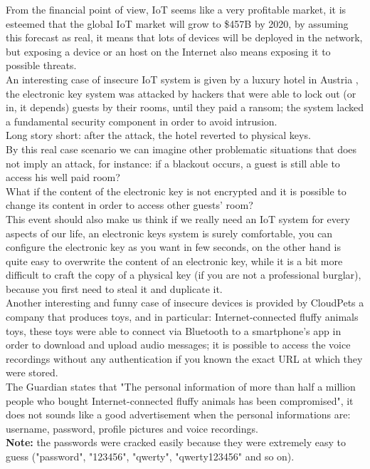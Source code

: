\documentclass[12pt]{report}
\begin{document}
From the financial point of view, IoT seems like a very profitable market, it is esteemed that the global IoT market will grow to \$457B by 2020\cite{forbes}, by assuming this forecast as real, it means that lots of devices will be deployed in the network, but exposing a device
or an host on the Internet also means exposing it to possible threats.\\
An interesting case of insecure IoT system is given by a luxury hotel in Austria \cite{whydoiot}, the electronic key system was attacked
by hackers that were able to lock out (or in, it depends) guests by their rooms, until they paid a ransom; the system lacked a fundamental security
component in order to avoid intrusion.\\
Long story short: after the attack, the hotel reverted to physical keys.\\
By this real case scenario we can imagine other problematic situations that does not imply an attack, for instance: if a blackout occurs, a guest is still able to access	his well paid room?\\
What if the content of the electronic key is not encrypted and it is possible to change its content in order to access other guests' room?\\
This event should also make us think if we really need an IoT system for every aspects of our life, an electronic keys system is
surely comfortable, you can configure the electronic key as you want in few seconds, on the other hand is quite easy to overwrite the content
of an electronic key, while it is a bit more difficult to craft the copy of a physical key (if you are not a professional burglar), because you first need to steal it and duplicate it.\\
Another interesting and funny case of insecure devices is provided by CloudPets\cite{toys} a company that produces toys, and in particular: Internet-connected fluffy animals toys,
these toys were able to connect via Bluetooth to a smartphone's app in order to download and upload audio messages; it is possible to access the voice recordings without any authentication if you known the exact URL at which they were stored.\\
The Guardian states that "The personal information of more than half a million people who bought Internet-connected fluffy animals has been compromised", it does not sounds like a good advertisement
when the personal informations are: username, password, profile pictures and voice recordings.\\
\textbf{Note:} the passwords were cracked easily because they were extremely easy to guess ("password", "123456", "qwerty", "qwerty123456" and so on).\\
\end{document}
